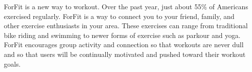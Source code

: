 ForFit is a new way to workout. Over the past year, just about 55\% of Americans exercised regularly. ForFit is a way to connect you to your friend, family, and other exercise enthusiasts in your area. These exercises can range from traditional bike riding and swimming to newer forms of exercise such as parkour and yoga. ForFit encourages group activity and connection so that workouts are never dull and so that users will be continually motivated and pushed toward their workout goals.